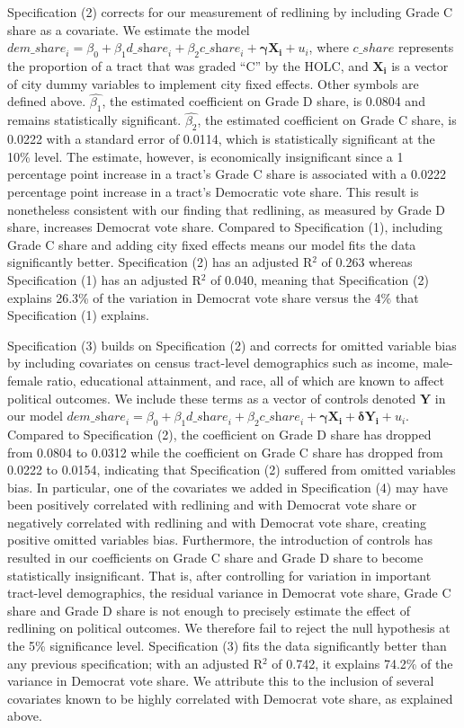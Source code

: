\documentclass{eco_375_paper}
\begin{document}
Specification (2) corrects for our measurement of redlining by including Grade C share as a covariate. We estimate the model ${\textit{dem\_share}_i} = {\beta_0} + {\beta_1}{\textit{d\_share}_i} + {\beta_2}{\textit{c\_share}_i} + \boldsymbol{{\gamma}} \boldsymbol{X_i} + u_i$, where $c\_share$ represents the proportion of a tract that was graded “C” by the HOLC, and $\boldsymbol{X_i}$ is a vector of city dummy variables to implement city fixed effects. Other symbols are defined above. $\hat{\beta_1}$, the estimated coefficient on Grade D share, is 0.0804 and remains statistically significant. $\hat{\beta_2}$, the estimated coefficient on Grade C share, is 0.0222 with a standard error of 0.0114, which is statistically significant at the 10\% level. The estimate, however, is economically insignificant since a 1 percentage point increase in a tract’s Grade C share is associated with a 0.0222 percentage point increase in a tract’s Democratic vote share. This result is nonetheless consistent with our finding that redlining, as measured by Grade D share, increases Democrat vote share. Compared to Specification (1), including Grade C share and adding city fixed effects means our model fits the data significantly better. Specification (2) has an adjusted R$^2$ of 0.263 whereas Specification (1) has an adjusted R$^2$ of 0.040, meaning that Specification (2) explains 26.3\% of the variation in Democrat vote share versus the 4\% that Specification (1) explains.

Specification (3) builds on Specification (2) and corrects for omitted variable bias by including covariates on census tract-level demographics such as income, male-female ratio, educational attainment, and race, all of which are known to affect political outcomes. We include these terms as a vector of controls denoted $\boldsymbol{Y}$ in our model ${\textit{dem\_share}_i} = {\beta_0} + {\beta_1}{\textit{d\_share}_i} + {\beta_2}{\textit{c\_share}_i} + \boldsymbol{{\gamma}} \boldsymbol{X_i} + \boldsymbol{{\delta}} \boldsymbol{Y_i} + u_i$. Compared to Specification (2), the coefficient on Grade D share has dropped from 0.0804 to 0.0312 while the coefficient on Grade C share has dropped from 0.0222 to 0.0154, indicating that Specification (2) suffered from omitted variables bias. In particular, one of the covariates we added in Specification (4) may have been positively correlated with redlining and with Democrat vote share or negatively correlated with redlining and with Democrat vote share, creating positive omitted variables bias. Furthermore, the introduction of controls has resulted in our coefficients on Grade C share and Grade D share to become statistically insignificant. That is, after controlling for variation in important tract-level demographics, the residual variance in Democrat vote share, Grade C share and Grade D share is not enough to precisely estimate the effect of redlining on political outcomes. We therefore fail to reject the null hypothesis at the 5\% significance level. Specification (3) fits the data significantly better than any previous specification; with an adjusted R$^2$ of 0.742, it explains 74.2\% of the variance in Democrat vote share. We attribute this to the inclusion of several covariates known to be highly correlated with Democrat vote share, as explained above.
\end{document}
